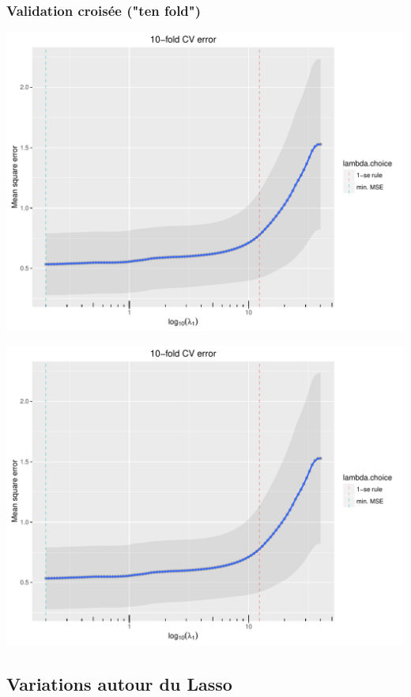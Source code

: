 \documentclass{beamer}\usepackage[]{graphicx}\usepackage[]{color}
\newenvironment{knitrout}{}{} %
\begin{document}
\begin{frame}[containsverbatim]
  \frametitle{Validation croisée ("ten fold")}
\begin{knitrout}\scriptsize
{}\color{fgcolor}
\includegraphics[width=\textwidth]{figures/crit_lassounnamed-chunk-75-1} 

\includegraphics[width=\textwidth]{figures/crit_lassounnamed-chunk-75-2} 

\end{knitrout}
\end{frame}






\subsection{Variations autour du Lasso}
\end{document}
